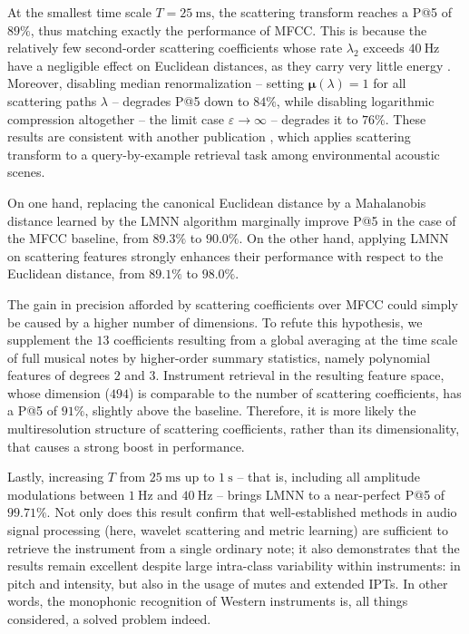 At the smallest time scale $T=\SI{25}{\milli\second}$, the scattering transform reaches a P@5 of $89\%$, thus matching exactly the performance of MFCC.
This is because the relatively few second-order scattering coefficients whose rate $\lambda_2$ exceeds $\SI{40}{\Hz}$ have a negligible effect on Euclidean distances, as they carry very little energy \cite{anden2014taslp}.
Moreover, disabling median renormalization -- \ie{} setting $\boldsymbol{\mu}(\lambda) = 1$ for all scattering paths $\lambda$ -- degrades P@5 down to $84\%$, while disabling logarithmic compression altogether -- \ie{} the limit case $\varepsilon \rightarrow \infty$ -- degrades it to $76\%$.
These results are consistent with another publication \cite{lostanlen2018eurasip}, which applies scattering transform to a query-by-example retrieval task among environmental acoustic scenes.

On one hand, replacing the canonical Euclidean distance by a Mahalanobis distance learned by the LMNN algorithm marginally improve P@5 in the case of the MFCC baseline, from $89.3\%$ to $90.0\%$.
On the other hand, applying LMNN on scattering features strongly enhances their performance with respect to the Euclidean distance, from $89.1\%$ to $98.0\%$.

The gain in precision afforded by scattering coefficients over MFCC could simply be caused by a higher number of dimensions.
To refute this hypothesis, we supplement the $13$ coefficients resulting from a global averaging at the time scale of full musical notes by higher-order summary statistics, namely polynomial features of degrees $2$ and $3$.
Instrument retrieval in the resulting feature space, whose dimension ($494$) is comparable to the number of scattering coefficients, has a P@5 of $91\%$, \ie{} slightly above the baseline.
Therefore, it is more likely the multiresolution structure of scattering coefficients, rather than its dimensionality, that causes a strong boost in performance.

Lastly, increasing $T$ from $\SI{25}{\milli\second}$ up to $\SI{1}{\second}$ -- that is, including all amplitude modulations between $\SI{1}{\Hz}$ and $\SI{40}{\Hz}$ -- brings LMNN to a near-perfect P@5 of $99.71\%$.
Not only does this result confirm that well-established methods in audio signal processing (here, wavelet scattering and metric learning) are sufficient to retrieve the instrument from a single ordinary note; it also demonstrates that the results remain excellent despite large intra-class variability within instruments: in pitch and intensity, but also in the usage of mutes and extended IPTs.
In other words, the monophonic recognition of Western instruments is, all things considered, a solved problem indeed.

